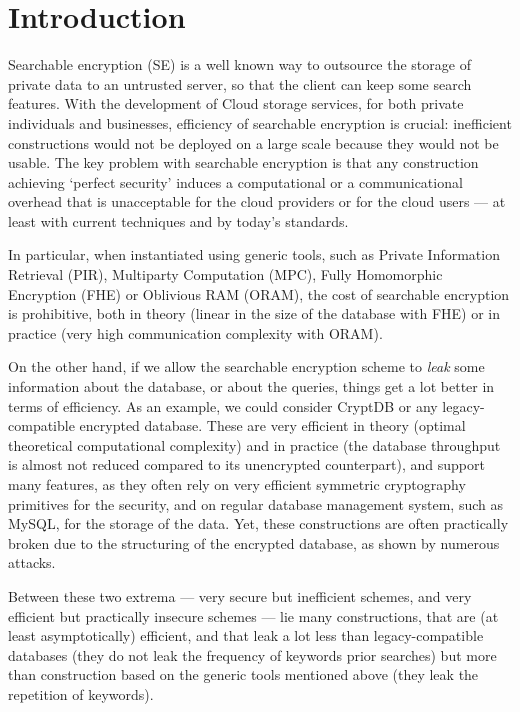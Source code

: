 

\section{Introduction} %
\label{sec:introduction}

Searchable encryption (SE) is a well known way to outsource the storage of private data to an untrusted server, so that the client can keep some search features.
With the development of Cloud storage services, for both private individuals and businesses, efficiency of searchable encryption is crucial: inefficient constructions would not be deployed on a large scale because they would not be usable.
The key problem with searchable encryption is that any construction achieving `perfect security' induces a computational or a communicational overhead that is unacceptable for the cloud providers or for the cloud users --- at least with current techniques and by today's standards.


In particular, when instantiated using generic tools, such as Private Information Retrieval (PIR), Multiparty Computation (MPC), Fully Homomorphic Encryption (FHE) or Oblivious RAM (ORAM), the cost of searchable encryption is prohibitive, both in theory (\eg linear in the size of the database with FHE) or in practice (very high communication complexity with ORAM).

On the other hand, if we allow the searchable encryption scheme to \emph{leak} some information about the database, or about the queries, things get a lot better in terms of efficiency.
As an example, we could consider CryptDB or any legacy-compatible encrypted database.
These are very efficient in theory (optimal theoretical computational complexity) and in practice (the database throughput is almost not reduced compared to its unencrypted counterpart), and support many features, as they often rely on very efficient symmetric cryptography primitives for the security, and on regular database management system, such as MySQL, for the storage of the data.
Yet, these constructions are often practically broken due to the structuring of the encrypted database, as shown by numerous attacks.

Between these two extrema --- very secure but inefficient schemes, and very efficient but practically insecure schemes --- lie many constructions, that are (at least asymptotically) efficient, and that leak a lot less than legacy-compatible databases (\eg they do not leak the frequency of keywords prior searches) but more than construction based on the generic tools mentioned above (\eg they leak the repetition of keywords).

